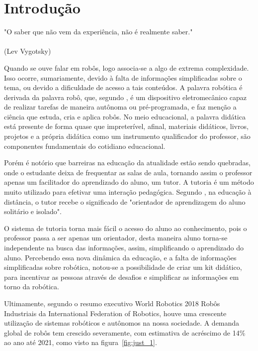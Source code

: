\chapter{Introdução}
\label{chap:intro}
\begin{flushright}
	"O saber que não vem da experiência, não é realmente saber." \\
	\ \\
	(Lev Vygotsky)
\end{flushright}

Quando se ouve falar em robôs, logo associa-se a algo de extrema complexidade. Isso ocorre, sumariamente, devido à falta de informações simplificadas sobre o tema, ou devido a dificuldade de acesso a tais conteúdos. A palavra robótica é derivada da palavra robô, que, segundo \cite{goncalves2007}, é um dispositivo eletromecânico capaz de realizar tarefas de maneira autônoma ou pré-programada, e faz menção a ciência que estuda, cria e aplica robôs. 
No meio educacional, a palavra didática está presente de forma quase que impreterível, afinal, materiais didáticos, livros, projetos e a própria didática como um instrumento qualificador do professor, são componentes fundamentais do cotidiano educacional.

Porém é notório que barreiras na educação da atualidade estão sendo quebradas, onde o estudante deixa de frequentar as salas de aula, tornando assim o professor apenas um facilitador do aprendizado do aluno, um tutor. A tutoria é um método muito utilizado para efetivar uma interação pedagógica. Segundo \cite{sa1998}, na educação à distância, o tutor recebe o significado de "orientador de aprendizagem do aluno solitário e isolado".

O sistema de tutoria torna mais fácil o acesso do aluno ao conhecimento, pois o professor passa a ser apenas um orientador, desta maneira aluno torna-se independente na busca das informações, assim, simplificando o aprendizado do aluno. Percebendo essa nova dinâmica da educação, e a falta de informações simplificadas sobre robótica, notou-se a possibilidade de criar um kit didático, para incentivar as pessoas através de desafios e simplificar as informações em torno da robótica.

Ultimamente, segundo o resumo executivo World Robotics 2018 Robôs Industriais da International Federation of Robotics\cite{ifr2018}, houve uma crescente utilização de sistemas robóticos e autônomos na nossa sociedade. A demanda global de robôs tem crescido severamente, com estimativa de acréscimo de 14\% ao ano até 2021, como visto na figura~\ref{fig:just_1}.

